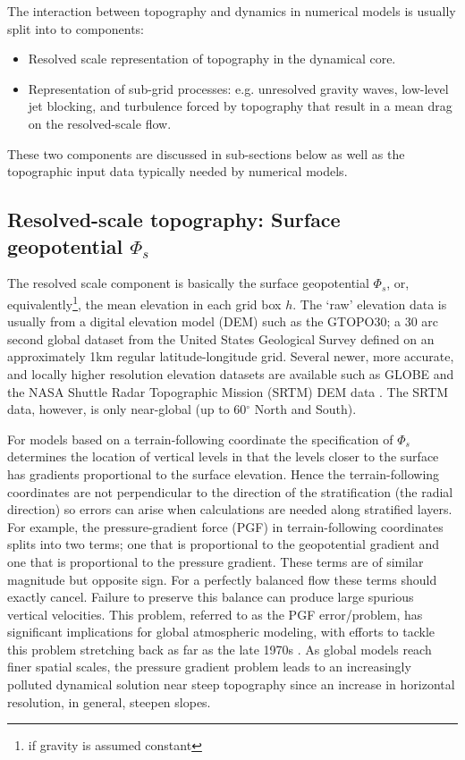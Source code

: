 \documentclass[gmd]{copernicus}
\begin{document}
The interaction between topography and dynamics in numerical models is usually split into to components:
\begin{itemize}
\item Resolved scale representation of topography in the dynamical core.
\item Representation of sub-grid processes: e.g. unresolved gravity waves, low-level jet blocking, and turbulence forced by topography that result in a mean drag on the resolved-scale flow.
\end{itemize}
These two components are discussed in sub-sections below as well as the topographic input data typically needed by numerical models.
\subsection{Resolved-scale topography: Surface geopotential $\Phi_s$}
The resolved scale component is basically the surface geopotential $\Phi_s$, or, equivalently{\footnote{if gravity is assumed constant}}, the mean elevation in each grid box $h$. The `raw' elevation data is usually from a digital elevation model (DEM) such as the GTOPO30; a 30 arc second global dataset from the United States Geological Survey \citep[USGS; ][]{USGS} defined on an approximately 1km regular latitude-longitude grid. Several newer, more accurate, and locally higher resolution elevation datasets are available such as GLOBE \citep{GLOBE} and the NASA Shuttle Radar Topographic Mission (SRTM) DEM data \citep{SRTM}. The SRTM data, however, is only near-global (up to 60$^\circ$ North and South).

For models based on a terrain-following coordinate the specification of $\Phi_s$ determines the location of vertical levels in that the levels closer to the surface has gradients proportional to the surface elevation. Hence the terrain-following coordinates are not perpendicular to the direction of the stratification (the radial direction) so errors can arise when calculations are needed along stratified layers. For example, the pressure-gradient force (PGF) in terrain-following coordinates splits into two terms; one that is proportional to the geopotential gradient and one that is proportional to the pressure gradient. These terms are of similar magnitude but opposite sign. For a perfectly balanced flow these terms should exactly cancel. Failure to preserve this balance can produce large spurious vertical velocities. This problem, referred to as the PGF error/problem, has significant implications for global atmospheric modeling, with efforts to tackle this problem stretching back as far as the late 1970s \citep{ZIJ1977BzPdA, DTMZIJ1986MAP}.  As global models reach finer spatial scales, the pressure gradient problem leads to an increasingly polluted dynamical solution near steep topography since an increase in horizontal resolution, in general, steepen slopes. 
\end{document}
